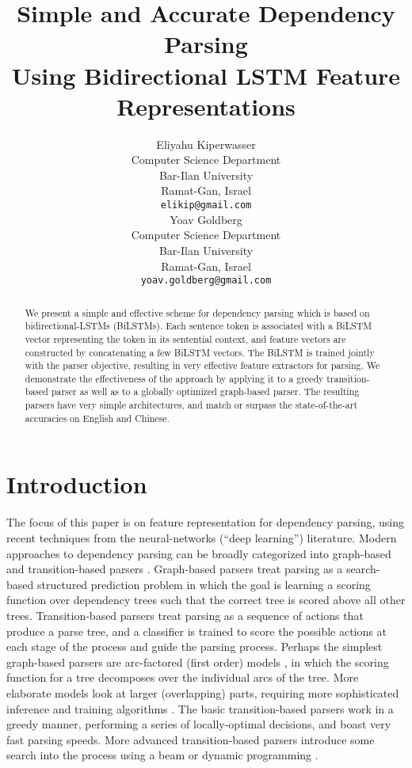 \documentclass[11pt]{article}
\title{Simple and Accurate Dependency Parsing \\ Using Bidirectional LSTM
Feature Representations}
\author{Eliyahu Kiperwasser \\
  Computer Science Department \\
  Bar-Ilan University \\
  Ramat-Gan, Israel \\
  {\tt elikip@gmail.com} \\\And
  Yoav Goldberg \\
  Computer Science Department \\
  Bar-Ilan University \\
  Ramat-Gan, Israel \\
  {\tt yoav.goldberg@gmail.com} \\}
\date{}
\begin{document}
\maketitle
\begin{abstract}

    We present a simple and effective scheme for dependency parsing which is
    based on bidirectional-LSTMs (BiLSTMs).
    Each sentence token is associated with a \mbox{BiLSTM} vector representing the
    token in its sentential context, and feature vectors are constructed by
    concatenating a few \mbox{BiLSTM} vectors.  The \mbox{BiLSTM} is trained jointly with the parser
    objective, resulting in very effective feature extractors for parsing.
    We demonstrate the effectiveness of the approach by applying it to a greedy
    transition-based parser as well as to a globally optimized graph-based
    parser.
    The resulting parsers have very simple architectures, and match or surpass the
    state-of-the-art accuracies on English and Chinese.

\end{abstract}

\section{Introduction}

The focus of this paper is on feature representation for dependency parsing,
using recent techniques from the neural-networks (``deep learning'') literature.
Modern approaches to dependency parsing can be broadly categorized into
graph-based and transition-based parsers \cite{kubler2008dependency}.
Graph-based parsers \cite{mcdonald-phd} treat parsing as a search-based structured prediction
problem in which the goal is learning a scoring function over dependency trees
such that the correct tree is scored above all other trees.  Transition-based
parsers \cite{arc-eager,nivre2008algorithms} treat parsing as a sequence of actions that produce a parse tree,
and a classifier is trained to score the possible actions at each stage of the
process and guide the parsing process.
Perhaps the simplest graph-based parsers are arc-factored (first
order) models \cite{mcdonald-phd}, in which the scoring function for a tree
decomposes over the individual arcs of the tree.  More elaborate models look at
larger (overlapping) parts, requiring more sophisticated inference and training
algorithms \cite{martins2009ilp,koo2010thirdorder}.  The basic transition-based parsers work in a greedy
manner, performing a series of locally-optimal decisions, and boast very fast
parsing speeds.  More advanced transition-based parsers introduce some search into the process
using a beam \cite{tale-two-parsers} or dynamic programming \cite{huang-sagae:2010:ACL}.
\end{document}
